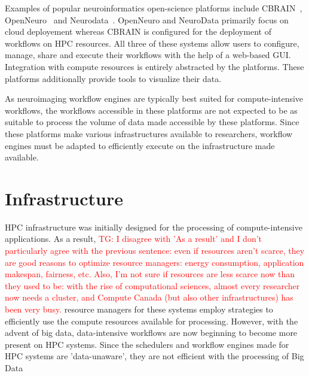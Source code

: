 \documentclass{report}
\newcommand{\tristan}[1]{\textcolor{red}{TG: #1}}
\begin{document}
            Examples of popular neuroinformatics open-science platforms include 
            CBRAIN~\cite{10.3389/fninf.2014.00054}, 
            OpenNeuro~\cite{gorgolewski2017openneuro} and 
            Neurodata~\cite{burns2018community}. OpenNeuro and NeuroData primarily focus on
            cloud deployement whereas CBRAIN is configured for the deployment
            of workflows on HPC resources. All three of these systems allow 
            users to configure, manage, share and execute their workflows with 
            the help of a web-based GUI. Integration with compute resources is
            entirely abstracted by the platforms. These platforms additionally
            provide tools to visualize their data.

            As neuroimaging workflow engines are typically best suited for 
            compute-intensive workflows, the workflows accessible in these 
            platforms are not expected to be as suitable to process the 
            volume of data made accessible by these platforms. Since these 
            platforms make various infrastructures available to researchers, 
            workflow engines must be adapted to efficiently execute on the 
            infrastructure made available.
            
        \section{Infrastructure}\label{infrastructure}
            HPC infrastructure was initially designed for the processing of 
            compute-intensive applications. As a result, \tristan{I disagree with 'As a result' and I don't particularly agree with the previous sentence: even if
            resources aren't scarce, they are good reasons to optimize resource managers: energy consumption, application makespan, fairness, etc. Also,
            I'm not sure if resources are less scarce now than they used to be: with the rise of computational sciences, almost every researcher now
            needs a cluster, and Compute Canada (but also other infrastructures) has been very busy.}
            resource managers for these systems employ
            strategies to efficiently use the compute resources available for 
            processing. However, with the advent of big data, data-intensive 
            workflows are now beginning to become more present on HPC systems.
            Since the schedulers and workflow engines made for HPC systems are 
            'data-unaware', they are not efficient with the processing of Big
            Data
\end{document}
